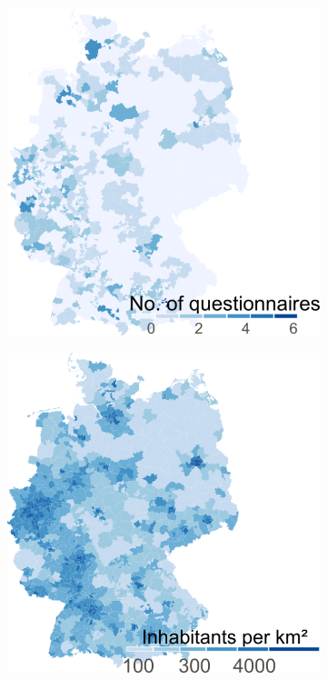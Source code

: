 \documentclass[a4paper,oneside,11pt,english]{scrartcl}
\begin{document}
\begin{figure}[h!]
	\centering
	\begin{subfigure}[b]{0.35\linewidth}
		\includegraphics[width=.90\textwidth]{fig1a.questionnaires.v1.0.png}
		\label{fig1:questionnaires}
	\end{subfigure}%
	\begin{subfigure}[b]{0.35\linewidth}
		\includegraphics[width=.90\textwidth]{fig1b.population_density.1.0.png}

\end{subfigure}
\end{figure}
\end{document}
